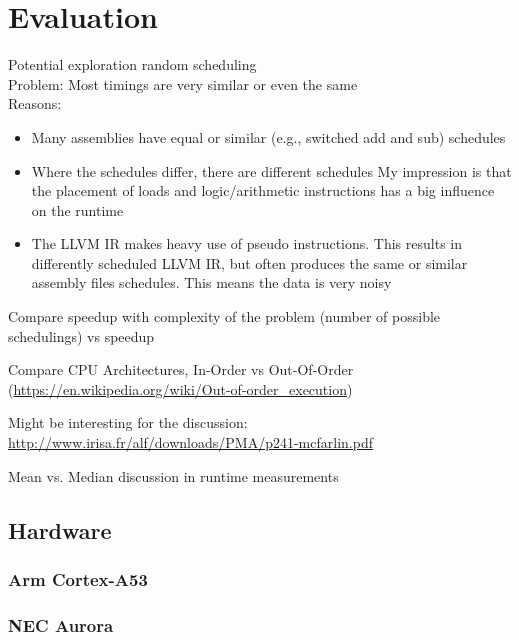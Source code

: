 \chapter{Evaluation}
Potential exploration \rightarrow random scheduling \\
Problem: Most timings are very similar or even the same \\
Reasons:
\begin{itemize}
    \item Many assemblies have equal or similar (e.g., switched add and sub) schedules
    \item Where the schedules differ, there are different schedules
    My impression is that the placement of loads and logic/arithmetic instructions has a big influence on the runtime
    \item The LLVM IR makes heavy use of pseudo instructions.
    This results in differently scheduled LLVM IR, but often produces the same or similar assembly files schedules.
    This means the data is very noisy
\end{itemize}

Compare speedup with complexity of the problem (number of possible schedulings) vs speedup

Compare CPU Architectures, In-Order vs Out-Of-Order (\url{https://en.wikipedia.org/wiki/Out-of-order_execution})

Might be interesting for the discussion: \url{http://www.irisa.fr/alf/downloads/PMA/p241-mcfarlin.pdf}

Mean vs. Median discussion in runtime measurements

\section{Hardware}
\subsection{Arm Cortex-A53}
\subsection{NEC Aurora}
